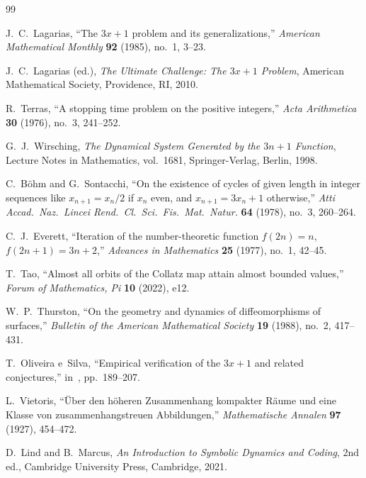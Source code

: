 \documentclass[11pt,a4paper]{article}
\theoremstyle{plain}
\theoremstyle{definition}
\begin{document}

\begin{thebibliography}{99}

J.~C.~Lagarias,
``The $3x+1$ problem and its generalizations,''
\emph{American Mathematical Monthly} \textbf{92} (1985), no.~1, 3--23.

J.~C.~Lagarias (ed.),
\emph{The Ultimate Challenge: The $3x+1$ Problem},
American Mathematical Society, Providence, RI, 2010.

R.~Terras,
``A stopping time problem on the positive integers,''
\emph{Acta Arithmetica} \textbf{30} (1976), no.~3, 241--252.

G.~J.~Wirsching,
\emph{The Dynamical System Generated by the $3n+1$ Function},
Lecture Notes in Mathematics, vol.~1681, Springer-Verlag, Berlin, 1998.

C.~B\"ohm and G.~Sontacchi,
``On the existence of cycles of given length in integer sequences like $x_{n+1} = x_n/2$ if $x_n$ even, and $x_{n+1} = 3x_n + 1$ otherwise,''
\emph{Atti Accad.\ Naz.\ Lincei Rend.\ Cl.\ Sci.\ Fis.\ Mat.\ Natur.} \textbf{64} (1978), no.~3, 260--264.

C.~J.~Everett,
``Iteration of the number-theoretic function $f(2n) = n$, $f(2n+1) = 3n+2$,''
\emph{Advances in Mathematics} \textbf{25} (1977), no.~1, 42--45.

T.~Tao,
``Almost all orbits of the Collatz map attain almost bounded values,''
\emph{Forum of Mathematics, Pi} \textbf{10} (2022), e12.

W.~P.~Thurston,
``On the geometry and dynamics of diffeomorphisms of surfaces,''
\emph{Bulletin of the American Mathematical Society} \textbf{19} (1988), no.~2, 417--431.

T.~Oliveira e~Silva,
``Empirical verification of the $3x+1$ and related conjectures,''
in~\cite{Lagarias2010}, pp.~189--207.

L.~Vietoris,
``\"Uber den h\"oheren Zusammenhang kompakter R\"aume und eine Klasse von zusammenhangstreuen Abbildungen,''
\emph{Mathematische Annalen} \textbf{97} (1927), 454--472.

D.~Lind and B.~Marcus,
\emph{An Introduction to Symbolic Dynamics and Coding},
2nd ed., Cambridge University Press, Cambridge, 2021.

\end{thebibliography}
\end{document}
